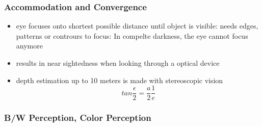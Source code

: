 \documentclass{standalone}
\begin{document}
\subsubsection{Accommodation and Convergence}
\begin{itemize}
	\item eye focuses onto shortest possible distance until object is visible: needs edges, patterns or contrours to focus: In compelte darkness, the eye cannot focus anymore
	\item results in near sightedness when looking through a optical device
	\item depth estimation up to 10 meters is made with stereoscopic vision $$ tan \frac{\epsilon}{2} = \frac{a}{2} \frac{1}{e}$$
\end{itemize}
\subsubsection{B/W Perception, Color Perception}
\end{document}

